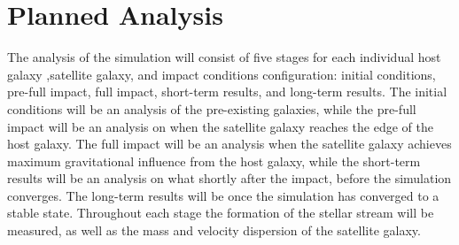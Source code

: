 \documentclass{article}
\begin{document}
\section{Planned Analysis}
The analysis of the simulation will consist of five stages for each individual host galaxy ,satellite galaxy, and impact conditions configuration: initial conditions, pre-full impact, full impact, short-term results, and long-term results. The initial conditions will be an analysis of the pre-existing galaxies, while the pre-full impact will be an analysis on when the satellite galaxy reaches the edge of the host galaxy. The full impact will be an analysis when the satellite galaxy achieves maximum gravitational influence from the host galaxy, while the short-term results will be an analysis on what shortly after the impact, before the simulation converges. The long-term results will be once the simulation has converged to a stable state. Throughout each stage the formation of the stellar stream will be measured, as well as the mass and velocity dispersion of the satellite galaxy. 
\end{document}
